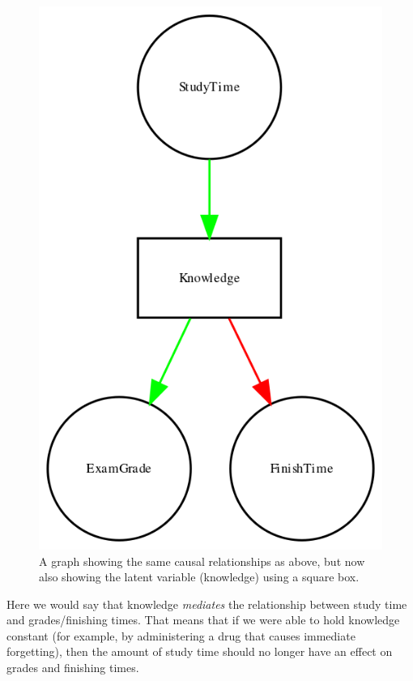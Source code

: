 \documentclass[
  12pt,
]{book}
\begin{document}
\begin{figure}
\includegraphics[width=6.94in,height=0.5\textheight]{images/dag_latent_example} \caption{A graph showing the same causal relationships as above, but now also showing the latent variable (knowledge) using a square box.}\label{fig:latentCausalGraph}
\end{figure}

Here we would say that knowledge \emph{mediates} the relationship between study time and grades/finishing times. That means that if we were able to hold knowledge constant (for example, by administering a drug that causes immediate forgetting), then the amount of study time should no longer have an effect on grades and finishing times.
\end{document}
